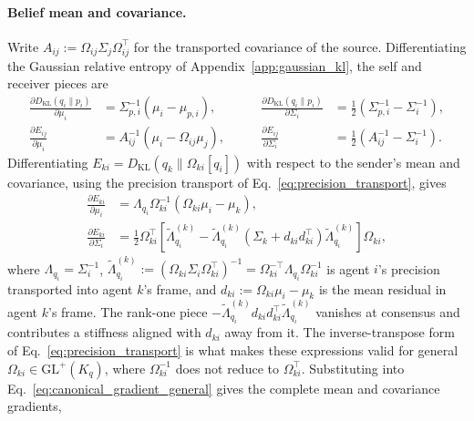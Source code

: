 \documentclass[11pt]{article}
\begin{document}
\paragraph{Belief mean and covariance.}
Write $A_{ij} := \Omega_{ij}\Sigma_j\Omega_{ij}^\top$ for the transported covariance of the source. Differentiating the Gaussian relative entropy of Appendix~\ref{app:gaussian_kl}, the self and receiver pieces are
\begin{equation}
\begin{aligned}
\frac{\partial D_{\mathrm{KL}}(q_i \| p_i)}{\partial \mu_i} &= \Sigma_{p,i}^{-1}(\mu_i - \mu_{p,i}),
&\qquad
\frac{\partial D_{\mathrm{KL}}(q_i \| p_i)}{\partial \Sigma_i} &= \frac{1}{2}\left(\Sigma_{p,i}^{-1} - \Sigma_i^{-1}\right), \\
\frac{\partial E_{ij}}{\partial \mu_i} &= A_{ij}^{-1}(\mu_i - \Omega_{ij}\mu_j),
&\qquad
\frac{\partial E_{ij}}{\partial \Sigma_i} &= \frac{1}{2}\left(A_{ij}^{-1} - \Sigma_i^{-1}\right).
\end{aligned}
\end{equation}
Differentiating $E_{ki} = D_{\mathrm{KL}}(q_k \| \Omega_{ki}[q_i])$ with respect to the sender's mean and covariance, using the precision transport of Eq.~\eqref{eq:precision_transport}, gives
\begin{align}
\frac{\partial E_{ki}}{\partial \mu_i} &= \Lambda_{q_i}\Omega_{ki}^{-1}\left(\Omega_{ki}\mu_i - \mu_k\right), \\
\frac{\partial E_{ki}}{\partial \Sigma_i} &= \frac{1}{2}\Omega_{ki}^{\top}\left[\tilde{\Lambda}_{q_i}^{(k)} - \tilde{\Lambda}_{q_i}^{(k)}\left(\Sigma_k + d_{ki}d_{ki}^{\top}\right)\tilde{\Lambda}_{q_i}^{(k)}\right]\Omega_{ki},
\end{align}
where $\Lambda_{q_i} = \Sigma_i^{-1}$, $\tilde{\Lambda}_{q_i}^{(k)} := (\Omega_{ki}\Sigma_i\Omega_{ki}^{\top})^{-1} = \Omega_{ki}^{-\top}\Lambda_{q_i}\Omega_{ki}^{-1}$ is agent $i$'s precision transported into agent $k$'s frame, and $d_{ki} := \Omega_{ki}\mu_i - \mu_k$ is the mean residual in agent $k$'s frame. The rank-one piece $-\tilde{\Lambda}_{q_i}^{(k)}d_{ki}d_{ki}^{\top}\tilde{\Lambda}_{q_i}^{(k)}$ vanishes at consensus and contributes a stiffness aligned with $d_{ki}$ away from it. The inverse-transpose form of Eq.~\eqref{eq:precision_transport} is what makes these expressions valid for general $\Omega_{ki} \in \mathrm{GL}^{+}(K_q)$, where $\Omega_{ki}^{-1}$ does not reduce to $\Omega_{ki}^{\top}$. Substituting into Eq.~\eqref{eq:canonical_gradient_general} gives the complete mean and covariance gradients,
\end{document}
